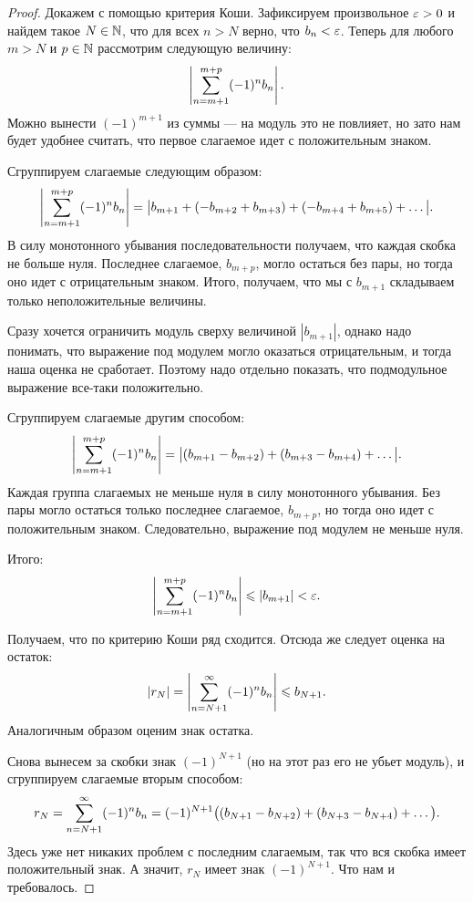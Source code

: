 \begin{proof}
Докажем с помощью критерия Коши. Зафиксируем произвольное $\varepsilon > 0$ и найдем такое $N \in \mathbb{N}$, что для всех $n > N$ верно, что $b_n < \varepsilon$. Теперь для любого $m > N$ и $p \in \mathbb{N}$ рассмотрим следующую величину:
$$
\left| \sum\limits_{n=m+1}^{m+p} (-1)^n b_n \right|.
$$  
Можно вынести $(-1)^{m+1}$ из суммы --- на модуль это не повлияет, но зато нам будет удобнее считать, что первое слагаемое идет с положительным знаком.

Сгруппируем слагаемые следующим образом:
$$
\left| \sum\limits_{n=m+1}^{m+p} (-1)^n b_n \right| = \big|b_{m+1} + (- b_{m+2} + b_{m+3}) + (- b_{m+4} + b_{m+5}) + \ldots\big|.
$$
В силу монотонного убывания последовательности получаем, что каждая скобка не больше нуля. Последнее слагаемое, $b_{m+p}$, могло остаться без пары, но тогда оно идет с отрицательным знаком. Итого, получаем, что мы с $b_{m+1}$ складываем только неположительные величины. 

Сразу хочется ограничить модуль сверху величиной $|b_{m+1}|$, однако надо понимать, что выражение под модулем могло оказаться отрицательным, и тогда наша оценка не сработает. Поэтому надо отдельно показать, что подмодульное выражение все-таки положительно.

Сгруппируем слагаемые другим способом:
$$
\left| \sum\limits_{n=m+1}^{m+p} (-1)^n b_n \right| = \big|(b_{m+1} - b_{m+2}) + (b_{m+3} - b_{m+4}) + \ldots\big|.
$$
Каждая группа слагаемых не меньше нуля в силу монотонного убывания. Без пары могло остаться только последнее слагаемое, $b_{m+p}$, но тогда оно идет с положительным знаком. Следовательно, выражение под модулем не меньше нуля.

Итого:
$$
\left| \sum\limits_{n=m+1}^{m+p} (-1)^n b_n \right| \leqslant |b_{m+1}| < \varepsilon.
$$

Получаем, что по критерию Коши ряд сходится. Отсюда же следует оценка на остаток: 
$$
|r_N| = \left| \sum\limits_{n=N+1}^{\infty}(-1)^n b_n  \right| \leqslant b_{N+1}.
$$
Аналогичным образом оценим знак остатка.

Снова вынесем за скобки знак $(-1)^{N+1}$ (но на этот раз его не убьет модуль), и сгруппируем слагаемые вторым способом:
$$
r_N = \sum\limits_{n=N+1}^{\infty} (-1)^n b_n  = (-1)^{N+1}\big((b_{N+1} - b_{N+2}) + (b_{N+3} - b_{N+4}) + \ldots\big).$$
Здесь уже нет никаких проблем с последним слагаемым, так что вся скобка имеет положительный знак. А значит, $r_N$ имеет знак $(-1)^{N+1}$. Что нам и требовалось.
\end{proof}

